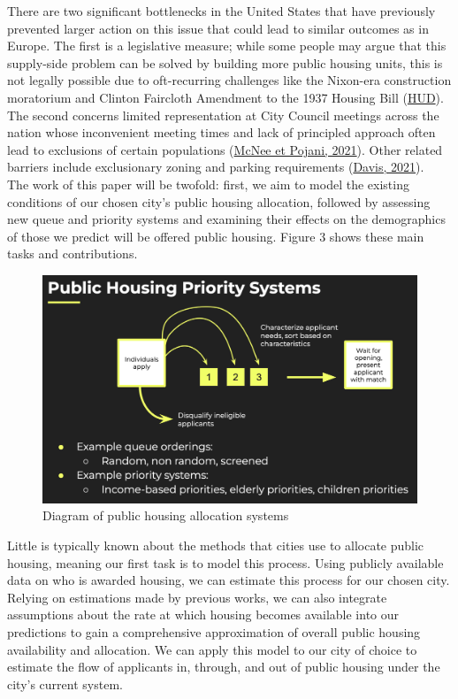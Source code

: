 \documentclass[11pt]{article}
\begin{document}
There are two significant bottlenecks in the United States that have previously prevented larger action on this issue that could lead to similar outcomes as in Europe. The first is a legislative measure; while some people may argue that this supply-side problem can be solved by building more public housing units, this is not legally possible due to oft-recurring challenges like the Nixon-era construction moratorium and Clinton Faircloth Amendment to the 1937 Housing Bill (\href{https://www.hud.gov/sites/documents/FRCLTH-LMT.PDF}{HUD}). The second concerns limited representation at City Council meetings across the nation whose inconvenient meeting times and lack of principled approach often lead to exclusions of certain populations (\href{https://www.ncbi.nlm.nih.gov/pmc/articles/PMC8149917/}{McNee et Pojani, 2021}). Other related barriers include exclusionary zoning and parking requirements (\href{https://www.brookings.edu/articles/the-double-edged-sword-of-upzoning/#:~:text=Cities%20are%20in%20desperate%20need,contributes%20to%20rising%20housing%20costs}{Davis, 2021}).\\
\newline
The work of this paper will be twofold: first, we aim to model the existing conditions of our chosen city's public housing allocation, followed by assessing new queue and priority systems and examining their effects on the demographics of those we predict will be offered public housing. Figure 3 shows these main tasks and contributions.\\
\begin{figure}
    \centering
    \includegraphics[width=0.75\linewidth]{schematic_priority _systems.png}
    \caption{Diagram of public housing allocation systems}
    \label{fig:schematic}
\end{figure}
\newline
Little is typically known about the methods that cities use to allocate public housing, meaning our first task is to model this process. Using publicly available data on who is awarded housing, we can estimate this process for our chosen city. Relying on estimations made by previous works, we can also integrate assumptions about the rate at which housing becomes available into our predictions to gain a comprehensive approximation of overall public housing availability and allocation. We can apply this model to our city of choice to estimate the flow of applicants in, through, and out of public housing under the city's current system. \\
\end{document}
